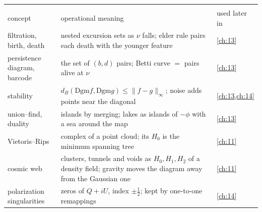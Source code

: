 \begin{center}
\small
\renewcommand{\arraystretch}{1.15}
\begin{tabularx}{\linewidth}{@{}>{\raggedright\arraybackslash}p{3.3cm}
                               >{\raggedright\arraybackslash}X
                               >{\raggedright\arraybackslash}p{2.3cm}@{}}
\toprule
\multicolumn{3}{@{}l}{\textbf{Persistent homology (part 12b)}}\\
concept & operational meaning & used later in\\\midrule
filtration, birth, death & nested excursion sets as $\nu$ falls; elder rule pairs each death with the younger feature & \cref{ch:13}\\
persistence diagram, barcode & the set of $(b,d)$ pairs; Betti curve $=$ pairs alive at $\nu$ & \cref{ch:13}\\
stability & $d_B(\mathrm{Dgm}f,\mathrm{Dgm}g)\le\|f-g\|_\infty$; noise adds points near the diagonal & \cref{ch:13,ch:14}\\
union--find, duality & islands by merging; lakes as islands of $-\phi$ with a sea around the map & \cref{ch:13}\\
Vietoris--Rips & complex of a point cloud; its $H_0$ is the minimum spanning tree & \cref{ch:11}\\
cosmic web & clusters, tunnels and voids as $H_0,H_1,H_2$ of a density field; gravity moves the diagram away from the Gaussian one & \cref{ch:11}\\
polarization singularities & zeros of $Q+iU$, index $\pm\frac12$; kept by one-to-one remappings & \cref{ch:14}\\
\bottomrule
\end{tabularx}
\end{center}

